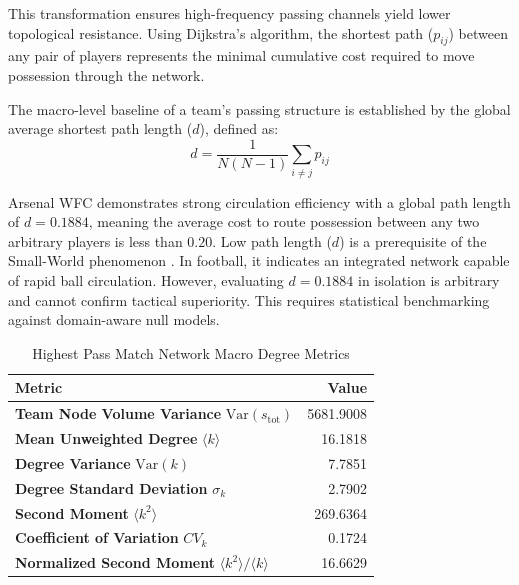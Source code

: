 \documentclass[12pt, a4paper]{article}
\begin{document}
This transformation ensures high-frequency passing channels yield lower topological resistance. Using Dijkstra’s algorithm, the shortest path ($p_{ij}$) between any pair of players represents the minimal cumulative cost required to move possession through the network.

The macro-level baseline of a team's passing structure is established by the global average shortest path length ($d$), defined as:
\begin{equation}
    d = \frac{1}{N(N-1)} \sum_{i \neq j} p_{ij}
\end{equation}

Arsenal WFC demonstrates strong circulation efficiency with a global path length of $d = 0.1884$, meaning the average cost to route possession between any two arbitrary players is less than $0.20$. Low path length ($d$) is a prerequisite of the Small-World phenomenon \cite{watts1998collective}. In football, it indicates an integrated network capable of rapid ball circulation. However, evaluating $d = 0.1884$ in isolation is arbitrary and cannot confirm tactical superiority. This requires statistical benchmarking against domain-aware null models.

\begin{table}[htbp]
    \centering
    \caption{Highest Pass Match Network Macro Degree Metrics}
    \label{tab:degree_metrics}
    \begin{tabularx}{\textwidth}{X r}
        \toprule
        \textbf{Metric} & \textbf{Value} \\
        \midrule
        \textbf{Team Node Volume Variance} $\text{Var}(s_{\text{tot}})$ & 5681.9008 \\
        \textbf{Mean Unweighted Degree} $\langle k \rangle$ & 16.1818 \\
        \textbf{Degree Variance} $\text{Var}(k)$ & 7.7851 \\
        \textbf{Degree Standard Deviation} $\sigma_k$ & 2.7902 \\
        \textbf{Second Moment} $\langle k^2 \rangle$ & 269.6364 \\
        \textbf{Coefficient of Variation} $CV_k$ & 0.1724 \\
        \textbf{Normalized Second Moment} $\langle k^2 \rangle / \langle k \rangle$ & 16.6629 \\
        \bottomrule
    \end{tabularx}
\end{table}

\newpage
\end{document}
